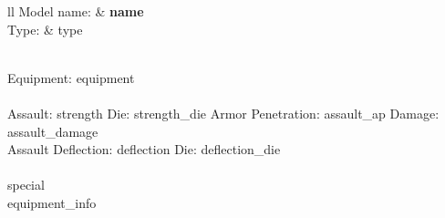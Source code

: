 \begin{{tabular}}{{ll}}
Model name: & {{\bf {name} }} \\
Type: & {type} \\
\end{{tabular}}
\ \\
Equipment: {equipment} \\
\ \\
Assault: {strength} Die: {strength_die} Armor Penetration: {assault_ap} Damage: {assault_damage} \\
Assault Deflection: {deflection} Die: {deflection_die}\\
\ \\
{special}
\ \\
{equipment_info} 
\ \\


